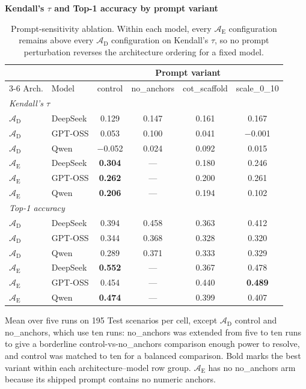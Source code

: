 \documentclass[final,3p,times]{elsarticle}
\begin{document}
\begin{table}[htbp]
\begin{threeparttable}
\small
\centering
\textbf{Kendall's $\tau$ and Top-1 accuracy by prompt variant}
\renewcommand{\arraystretch}{1.15}
\begin{tabular}{llcccc}
\toprule
& & \multicolumn{4}{c}{Prompt variant} \\
\cmidrule(lr){3-6}
Arch. & Model & control & no\_anchors & cot\_scaffold & scale\_0\_10 \\
\midrule
\multicolumn{6}{l}{\emph{Kendall's $\tau$}} \\
$\mathcal{A}_{\text{D}}$ & DeepSeek & 0.129 & 0.147 & 0.161 & 0.167 \\
$\mathcal{A}_{\text{D}}$ & GPT-OSS  & 0.053 & 0.100 & 0.041 & $-$0.001 \\
$\mathcal{A}_{\text{D}}$ & Qwen     & $-$0.052 & 0.024 & 0.092 & 0.015 \\
$\mathcal{A}_{\text{E}}$ & DeepSeek & \textbf{0.304} & --- & 0.180 & 0.246 \\
$\mathcal{A}_{\text{E}}$ & GPT-OSS  & \textbf{0.262} & --- & 0.200 & 0.261 \\
$\mathcal{A}_{\text{E}}$ & Qwen     & \textbf{0.206} & --- & 0.194 & 0.102 \\
\midrule
\multicolumn{6}{l}{\emph{Top-1 accuracy}} \\
$\mathcal{A}_{\text{D}}$ & DeepSeek & 0.394 & 0.458 & 0.363 & 0.412 \\
$\mathcal{A}_{\text{D}}$ & GPT-OSS  & 0.344 & 0.368 & 0.328 & 0.320 \\
$\mathcal{A}_{\text{D}}$ & Qwen     & 0.289 & 0.371 & 0.333 & 0.329 \\
$\mathcal{A}_{\text{E}}$ & DeepSeek & \textbf{0.552} & --- & 0.367 & 0.478 \\
$\mathcal{A}_{\text{E}}$ & GPT-OSS  & 0.454 & --- & 0.440 & \textbf{0.489} \\
$\mathcal{A}_{\text{E}}$ & Qwen     & \textbf{0.474} & --- & 0.399 & 0.407 \\
\bottomrule
\end{tabular}
\renewcommand{\arraystretch}{1.0}
\begin{tablenotes}\footnotesize
\item Mean over five runs on 195 Test scenarios per cell, except $\mathcal{A}_{\text{D}}$ control and no\_anchors, which use ten runs: no\_anchors was extended from five to ten runs to give a borderline control-vs-no\_anchors comparison enough power to resolve, and control was matched to ten for a balanced comparison. Bold marks the best variant within each architecture--model row group. $\mathcal{A}_{\text{E}}$ has no no\_anchors arm because its shipped prompt contains no numeric anchors.
\end{tablenotes}
\caption{Prompt-sensitivity ablation. Within each model, every $\mathcal{A}_{\text{E}}$ configuration remains above every $\mathcal{A}_{\text{D}}$ configuration on Kendall's $\tau$, so no prompt perturbation reverses the architecture ordering for a fixed model.}
\label{tab:prompt_ablation}
\end{threeparttable}
\end{table}
\end{document}
